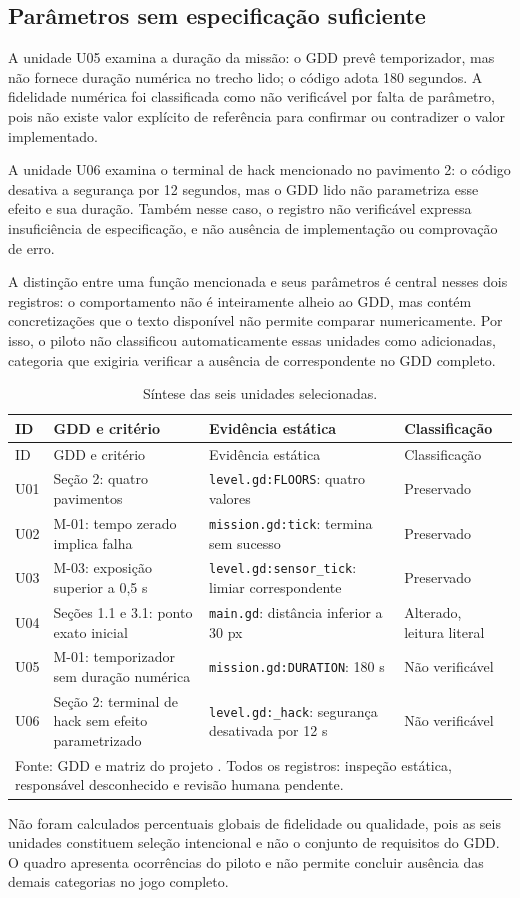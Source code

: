 \subsection{Parâmetros sem especificação suficiente}
A unidade U05 examina a duração da missão: o GDD prevê temporizador, mas não fornece duração numérica no trecho lido; o código adota 180 segundos. A fidelidade numérica foi classificada como não verificável por falta de parâmetro, pois não existe valor explícito de referência para confirmar ou contradizer o valor implementado.

A unidade U06 examina o terminal de hack mencionado no pavimento 2: o código desativa a segurança por 12 segundos, mas o GDD lido não parametriza esse efeito e sua duração. Também nesse caso, o registro não verificável expressa insuficiência de especificação, e não ausência de implementação ou comprovação de erro.

A distinção entre uma função mencionada e seus parâmetros é central nesses dois registros: o comportamento não é inteiramente alheio ao GDD, mas contém concretizações que o texto disponível não permite comparar numericamente. Por isso, o piloto não classificou automaticamente essas unidades como adicionadas, categoria que exigiria verificar a ausência de correspondente no GDD completo.

\begin{singlespace}
\begin{longtable}{p{}p{}p{}p{}}
\caption{Síntese das seis unidades selecionadas.}\label{tab:results}\\
\toprule ID & GDD e critério & Evidência estática & Classificação \\\midrule\endfirsthead
\toprule ID & GDD e critério & Evidência estática & Classificação \\\midrule\endhead
U01 & Seção 2: quatro pavimentos & \texttt{level.gd:FLOORS}: quatro valores & Preservado\\
U02 & M-01: tempo zerado implica falha & \texttt{mission.gd:tick}: termina sem sucesso & Preservado\\
U03 & M-03: exposição superior a 0,5 s & \texttt{level.gd:sensor\_tick}: limiar correspondente & Preservado\\
U04 & Seções 1.1 e 3.1: ponto exato inicial & \texttt{main.gd}: distância inferior a 30 px & Alterado, leitura literal\\
U05 & M-01: temporizador sem duração numérica & \texttt{mission.gd:DURATION}: 180 s & Não verificável\\
U06 & Seção 2: terminal de hack sem efeito parametrizado & \texttt{level.gd:\_hack}: segurança desativada por 12 s & Não verificável\\
\bottomrule
\multicolumn{4}{p{0.93\textwidth}}{\footnotesize Fonte: GDD  e matriz do projeto . Todos os registros: inspeção estática, responsável desconhecido e revisão humana pendente.}\\
\end{longtable}
\end{singlespace}

Não foram calculados percentuais globais de fidelidade ou qualidade, pois as seis unidades constituem seleção intencional e não o conjunto de requisitos do GDD. O quadro apresenta ocorrências do piloto e não permite concluir ausência das demais categorias no jogo completo.
